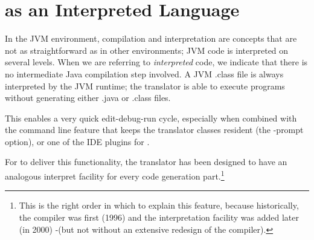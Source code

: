 {\chapter{\nr{} as an Interpreted Language}\label{interpreted}
In the JVM environment, compilation and interpretation are concepts
that are not as straightforward as in other environments; JVM code is
interpreted on several levels. When we are referring to
\emph{interpreted} \nr{} code, we indicate that there is no
intermediate Java compilation step involved. A JVM .class file is
always interpreted by the JVM runtime; the \nr{} translator is able to
execute programs without generating either .java or .class files.

This enables a very quick edit-debug-run cycle, especially when
combined with the command line feature that keeps the translator
classes resident (the -prompt option), or one of the IDE plugins for
\nr{}.

For \nr{} to deliver this functionality, the translator has been
designed to have an analogous interpret facility for every code
generation part.\footnote{This is the right order in which to explain this
  feature, because historically, the compiler was first (1996) and the
  interpretation facility was added later (in 2000) -(but not without an
  extensive redesign of the compiler).}




% 




}
